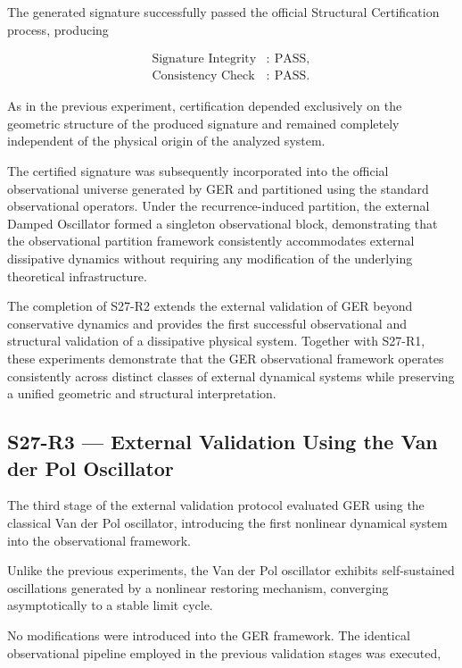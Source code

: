 The generated signature successfully passed the official Structural Certification process, producing

\[
\begin{aligned}
\text{Signature Integrity} &:\ \mathrm{PASS},\\
\text{Consistency Check} &:\ \mathrm{PASS}.
\end{aligned}
\]

As in the previous experiment, certification depended exclusively on the geometric structure of the produced signature and remained completely independent of the physical origin of the analyzed system.

The certified signature was subsequently incorporated into the official observational universe generated by GER and partitioned using the standard observational operators. Under the recurrence-induced partition, the external Damped Oscillator formed a singleton observational block, demonstrating that the observational partition framework consistently accommodates external dissipative dynamics without requiring any modification of the underlying theoretical infrastructure.

The completion of S27-R2 extends the external validation of GER beyond conservative dynamics and provides the first successful observational and structural validation of a dissipative physical system. Together with S27-R1, these experiments demonstrate that the GER observational framework operates consistently across distinct classes of external dynamical systems while preserving a unified geometric and structural interpretation.

\subsection{S27-R3 --- External Validation Using the Van der Pol Oscillator}

The third stage of the external validation protocol evaluated GER using the classical Van der Pol oscillator, introducing the first nonlinear dynamical system into the observational framework.

Unlike the previous experiments, the Van der Pol oscillator exhibits self-sustained oscillations generated by a nonlinear restoring mechanism, converging asymptotically to a stable limit cycle.

No modifications were introduced into the GER framework. The identical observational pipeline employed in the previous validation stages was executed,

